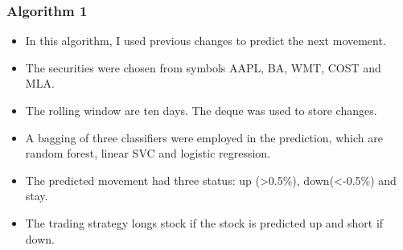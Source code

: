 \documentclass[11pt]{article}
\providecommand{\tightlist}{%
      \setlength{\itemsep}{0pt}\setlength{\parskip}{0pt}}
\begin{document}
    \subsubsection{Algorithm 1}\label{algorithm-1}

    \begin{itemize}
\tightlist
\item
  In this algorithm, I used previous changes to predict the next
  movement.
\item
  The securities were chosen from symbols AAPL, BA, WMT, COST and MLA.
\item
  The rolling window are ten days. The deque was used to store changes.
\item
  A bagging of three classifiers were employed in the prediction, which
  are random forest, linear SVC and logistic regression.
\item
  The predicted movement had three status: up (\textgreater{}0.5\%),
  down(\textless{}-0.5\%) and stay.
\item
  The trading strategy longs stock if the stock is predicted up and
  short if down.
\end{itemize}
\end{document}
